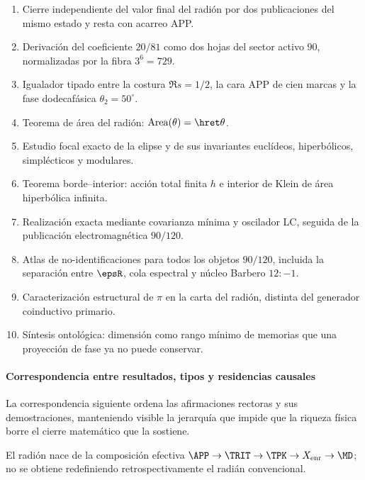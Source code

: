 \begin{enumerate}[label=\textbf{C\arabic*.}]
\item Cierre independiente del valor final del radión por dos publicaciones del mismo estado y
resta con acarreo APP.
\item Derivación del coeficiente \(20/81\) como dos hojas del sector activo
\(90\), normalizadas por la fibra \(3^6=729\).
\item Igualador tipado entre la costura \(\Re s=1/2\), la cara APP de cien
marcas y la fase dodecafásica \(\theta_2=50^\circ\).
\item Teorema de área del radión: \(\operatorname{Area}(\theta)=\hret\theta\).
\item Estudio focal exacto de la elipse y de sus invariantes euclídeos,
hiperbólicos, simplécticos y modulares.
\item Teorema borde--interior: acción total finita \(h\) e interior de Klein
de área hiperbólica infinita.
\item Realización exacta mediante covarianza mínima y oscilador LC, seguida de
la publicación electromagnética \(90/120\).
\item Atlas de no-identificaciones para todos los objetos \(90/120\), incluida
la separación entre \(\epsR\), cola espectral y núcleo Barbero \(12:-1\).
\item Caracterización estructural de \(\pi\) en la carta del radión, distinta
del generador coinductivo primario.
\item Síntesis ontológica: dimensión como rango mínimo de memorias que una
proyección de fase ya no puede conservar.
\end{enumerate}
\paragraph{Correspondencia entre resultados, tipos y residencias causales}

La correspondencia siguiente ordena las afirmaciones rectoras y sus demostraciones,
manteniendo visible la jerarquía que impide que
la riqueza física borre el cierre matemático que la sostiene.

\begin{exactbox}[title={Genealogía APP--TRIT--TPK del radión}]
El radión nace de la composición efectiva
\(\APP\to\TRIT\to\TPK\to X_{\mathrm{enr}}\to\MD\); no se obtiene
redefiniendo retrospectivamente el radián convencional.
\end{exactbox}

